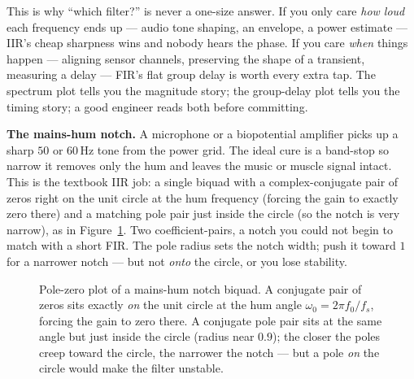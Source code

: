 \begin{aestheticbox}
This is why ``which filter?'' is never a one-size answer. If you only care
\emph{how loud} each frequency ends up --- audio tone shaping, an envelope, a power
estimate --- IIR's cheap sharpness wins and nobody hears the phase. If you care
\emph{when} things happen --- aligning sensor channels, preserving the shape of a
transient, measuring a delay --- FIR's flat group delay is worth every extra tap.
The spectrum plot tells you the magnitude story; the group-delay plot tells you the
timing story; a good engineer reads both before committing.
\end{aestheticbox}

\begin{applicationbox}
\textbf{The mains-hum notch.} A microphone or a biopotential amplifier picks up a
sharp $50$ or $60$\,Hz tone from the power grid. The ideal cure is a band-stop so
narrow it removes only the hum and leaves the music or muscle signal intact. This
is the textbook IIR job: a single biquad with a complex-conjugate pair of zeros
right on the unit circle at the hum frequency (forcing the gain to exactly zero
there) and a matching pole pair just inside the circle (so the notch is very
narrow), as in Figure~\ref{ch16:fig-notch-pz}. Two coefficient-pairs, a notch you
could not begin to match with a short FIR. The pole radius sets the notch width; push it toward $1$ for a narrower notch
--- but not \emph{onto} the circle, or you lose stability.
\end{applicationbox}

\begin{figure}[H]
\centering
{}
\caption{Pole-zero plot of a mains-hum notch biquad. A conjugate pair of zeros
sits exactly \emph{on} the unit circle at the hum angle $\omega_0 = 2\pi f_0/f_s$,
forcing the gain to zero there. A conjugate pole pair sits at the same angle but
just inside the circle (radius near $0.9$); the closer the poles creep toward the
circle, the narrower the notch --- but a pole \emph{on} the circle would make the
filter unstable.}
\label{ch16:fig-notch-pz}
\end{figure}

